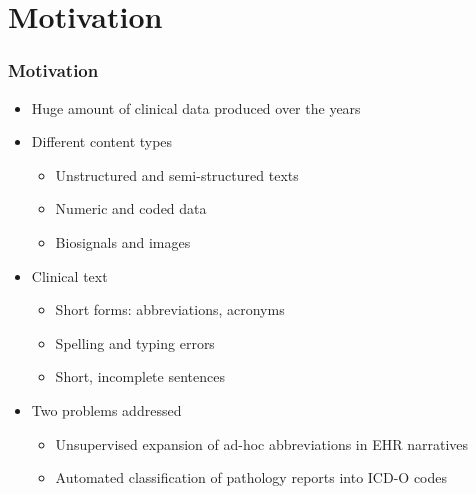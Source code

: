 \section*{Motivation}

\begin{frame}
	\frametitle{Motivation}
	\begin{itemize} \myspacing
		\item Huge amount of clinical data produced over the years
		\item Different content types
		\begin{itemize}
			\item Unstructured and semi-structured texts
			\item Numeric and coded data
			\item Biosignals and images
		\end{itemize}
		\item Clinical text
		\begin{itemize}
			\item Short forms: abbreviations, acronyms
			\item Spelling and typing errors
			\item Short, incomplete sentences
		\end{itemize}
		\item Two problems addressed 
		\begin{itemize}
			\item Unsupervised expansion of ad-hoc abbreviations in EHR narratives
			\item Automated classification of pathology reports into ICD-O codes 
		\end{itemize}
	\end{itemize}
\end{frame}

